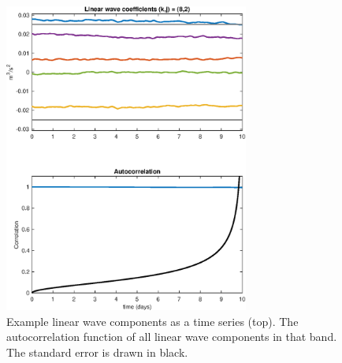 \documentclass[10pt]{article}
\begin{document}
\begin{figure}[t]
  \centerline{\includegraphics[width=19pc,angle=0]{figures/Autocorrelation_k_8_j_2}}
  \caption{Example linear wave components as a time series (top). The autocorrelation function of all linear wave components in that band. The standard error is drawn in black.}
  \label{Autocorrelation_k_8_j_2}
\end{figure}
\end{document}
